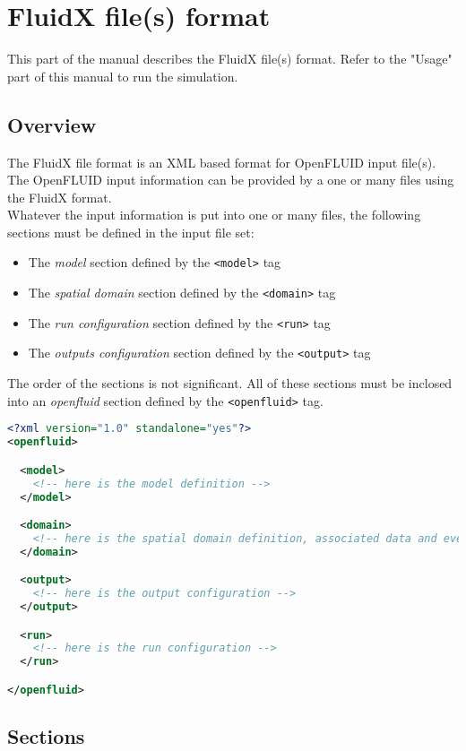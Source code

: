 \chapter{FluidX file(s) format}

This part of the manual describes the FluidX file(s) format. Refer to the "Usage"
part of this manual to run the simulation.

\section{Overview}

The FluidX file format is an XML based format for OpenFLUID input file(s).
The OpenFLUID input information can be provided by a one or many files using
the FluidX format.\\
Whatever the input information is put into one or many files, the following
sections must be defined in the input file set:
\begin{itemize}
  \item The \textit{model} section defined by the \texttt{<model>} tag
  \item The \textit{spatial domain} section defined by the \texttt{<domain>} tag
  \item The \textit{run configuration} section defined by the \texttt{<run>} tag
  \item The \textit{outputs configuration} section defined by the \texttt{<output>} tag  
\end{itemize}
The order of the sections is not significant. All of these sections must be
inclosed into an \textit{openfluid} section defined by the \texttt{<openfluid>}
tag.

\begin{lstlisting}[language=xml,title=\footnotesize\textit{summary view of the
XML tree for FluidX files}] <?xml version="1.0" standalone="yes"?>
<openfluid>

  <model>
    <!-- here is the model definition -->
  </model>

  <domain>
    <!-- here is the spatial domain definition, associated data and events -->   
  </domain>

  <output>
    <!-- here is the output configuration -->
  </output>

  <run>
    <!-- here is the run configuration -->
  </run>

</openfluid>
\end{lstlisting}


\section{Sections}


